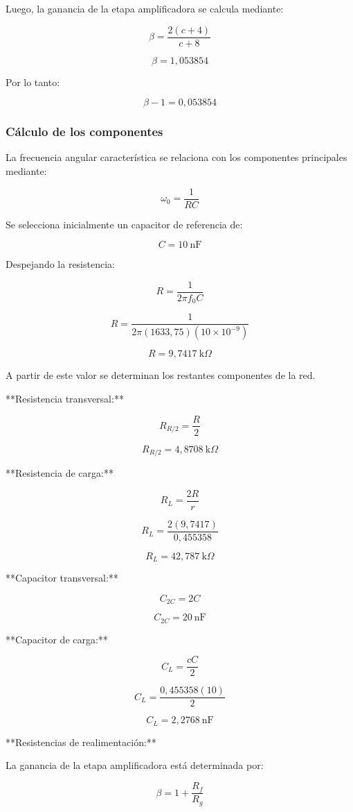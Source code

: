 \documentclass[12pt]{article}
\begin{document}
\begin{itemize}
Luego, la ganancia de la etapa amplificadora se calcula mediante:

\[
\beta=\frac{2(c+4)}{c+8}
\]

\[
\boxed{\beta=1,053854}
\]

Por lo tanto:

\[
\boxed{\beta-1=0,053854}
\]

\subsubsection{Cálculo de los componentes} 

La frecuencia angular característica se relaciona con los componentes principales mediante:

\[
\omega_0=\frac{1}{RC}
\]

Se selecciona inicialmente un capacitor de referencia de:

\[
C=10\ \text{nF}
\]

Despejando la resistencia:

\[
R=\frac{1}{2\pi f_0C}
\]

\[
R=
\frac{1}{2\pi(1633,75)(10\times10^{-9})}
\]

\[
\boxed{R=9,7417\ \text{k}\Omega}
\]

A partir de este valor se determinan los restantes componentes de la red.

**Resistencia transversal:**

\[
R_{R/2}=\frac{R}{2}
\]

\[
\boxed{R_{R/2}=4,8708\ \text{k}\Omega}
\]

**Resistencia de carga:**

\[
R_L=\frac{2R}{r}
\]

\[
R_L=\frac{2(9,7417)}{0,455358}
\]

\[
\boxed{R_L=42,787\ \text{k}\Omega}
\]

**Capacitor transversal:**

\[
C_{2C}=2C
\]

\[
\boxed{C_{2C}=20\ \text{nF}}
\]

**Capacitor de carga:**

\[
C_L=\frac{cC}{2}
\]

\[
C_L=\frac{0,455358(10)}{2}
\]

\[
\boxed{C_L=2,2768\ \text{nF}}
\]

**Resistencias de realimentación:**

La ganancia de la etapa amplificadora está determinada por:

\[
\beta=1+\frac{R_f}{R_g}
\]


\end{itemize}
\end{document}
